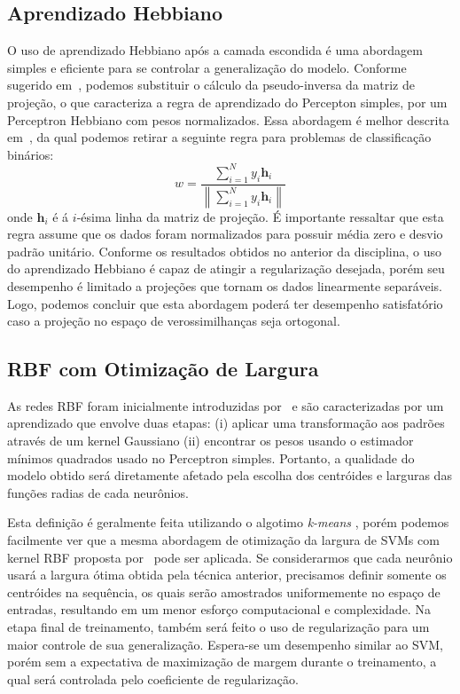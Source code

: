 \documentclass[conference]{IEEEtran}
\begin{document}
	\subsection{Aprendizado Hebbiano}
	O uso de aprendizado Hebbiano após a camada escondida é uma abordagem simples e eficiente para se controlar a generalização do modelo. Conforme sugerido em~\cite{horta2015aplicaccao}, podemos substituir o cálculo da pseudo-inversa da matriz de projeção, o que caracteriza a regra de aprendizado do Percepton simples, por um Perceptron Hebbiano com pesos normalizados. Essa abordagem é melhor descrita em~\cite{fernandez2011direct}, da qual podemos retirar a seguinte regra para problemas de classificação binários:
	\begin{equation}
		w = \frac{ \sum^{N}_{i=1} y_i\textbf{h}_i}{\left\|  \sum^{N}_{i=1} y_i\textbf{h}_i \right\| }
	\end{equation}
	onde $\textbf{h}_i$ é á $i$-ésima linha da matriz de projeção. É importante ressaltar que esta regra assume que os dados foram normalizados para possuir média zero e desvio padrão unitário. Conforme os resultados obtidos no anterior da disciplina, o uso do aprendizado Hebbiano é capaz de atingir a regularização desejada, porém seu desempenho é limitado a projeções que tornam os dados linearmente separáveis. Logo, podemos concluir que esta abordagem poderá ter desempenho satisfatório caso a projeção no espaço de verossimilhanças seja ortogonal.
	
	\subsection{RBF com Otimização de Largura}
	As redes RBF foram inicialmente introduzidas por~\cite{broomhead1988multivariablefi} e são caracterizadas por um aprendizado que envolve duas etapas: (i) aplicar uma transformação aos padrões através de um kernel Gaussiano (ii) encontrar os pesos usando o estimador mínimos quadrados usado no Perceptron simples. Portanto, a qualidade do modelo obtido será diretamente afetado pela escolha dos centróides e larguras das funções radias de cada neurônios. 
	
	Esta definição é geralmente feita utilizando o algotimo \textit{k-means} \cite{haykin2007neural}, porém podemos facilmente ver que a mesma abordagem de otimização da largura de SVMs com kernel RBF proposta por~\cite{menezes2019width} pode ser aplicada. Se considerarmos que cada neurônio usará a largura ótima obtida pela técnica anterior, precisamos definir somente os centróides na sequência, os quais serão amostrados uniformemente no espaço de entradas, resultando em um menor esforço computacional e complexidade. Na etapa final de treinamento, também será feito o uso de regularização para um maior controle de sua generalização. Espera-se um desempenho similar ao SVM, porém sem a expectativa de maximização de margem durante o treinamento, a qual será controlada pelo coeficiente de regularização.
	
\end{document}
